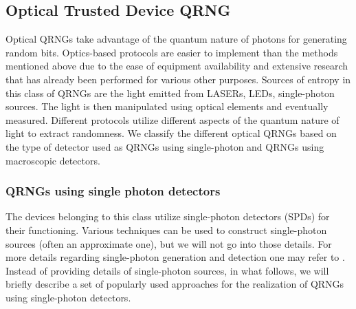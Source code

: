 \documentclass[]{interact}
\theoremstyle{plain}%
\theoremstyle{definition}
\theoremstyle{remark}
\begin{document}
\subsection{Optical Trusted Device QRNG}
Optical QRNGs take advantage of the quantum nature of photons for generating random bits. Optics-based protocols are easier to implement than the methods mentioned above due to the ease of equipment availability and extensive research that has already been performed for various other purposes. Sources of entropy in this class of QRNGs are the light emitted from LASERs, LEDs, single-photon sources. The light is then manipulated using optical elements and eventually measured. Different protocols utilize different aspects of the quantum nature of light to extract randomness. We classify the different optical QRNGs based on the type of detector used as QRNGs using single-photon and QRNGs using macroscopic detectors.

\subsubsection{QRNGs using single photon detectors}
The devices belonging to this class utilize single-photon detectors (SPDs) for their functioning. Various techniques can be used to construct single-photon sources (often an approximate one), but we will not go into those details. For more details regarding single-photon generation and detection one may refer to  \cite{doi:10.1063/1.3610677,Buller_2009}. Instead of providing details of single-photon sources, in what follows, we will briefly describe a set of popularly used approaches for the realization of QRNGs using single-photon detectors. 
\end{document}
